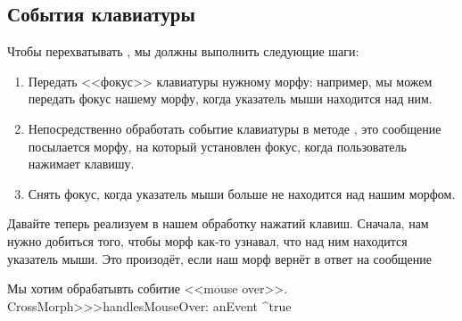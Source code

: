 \documentclass[a4paper,10pt,twoside]{book}
\begin{document}
\subsection{События клавиатуры}

Чтобы перехватывать , мы должны выполнить следующие шаги:
\begin{enumerate}
	\item Передать <<фокус>> клавиатуры нужному морфу: например, мы можем передать фокус нашему морфу, когда указатель мыши находится над ним.
	\item Непосредственно обработать событие клавиатуры в методе , это сообщение посылается морфу, на который установлен фокус, когда пользователь нажимает клавишу.
	\item Снять фокус, когда указатель мыши больше не находится над нашим морфом.
\end{enumerate}

Давайте теперь реализуем в нашем  обработку нажатий клавиш.
Сначала, нам нужно добиться того, чтобы морф как-то узнавал, что над ним находится указатель мыши.
Это произодёт, если наш морф вернёт  в ответ на сообщение 

\begin{method}{Мы хотим обрабатывть собитие <<mouse over>>.} 
CrossMorph>>>handlesMouseOver: anEvent
	^true
\end{method}
\end{document}
